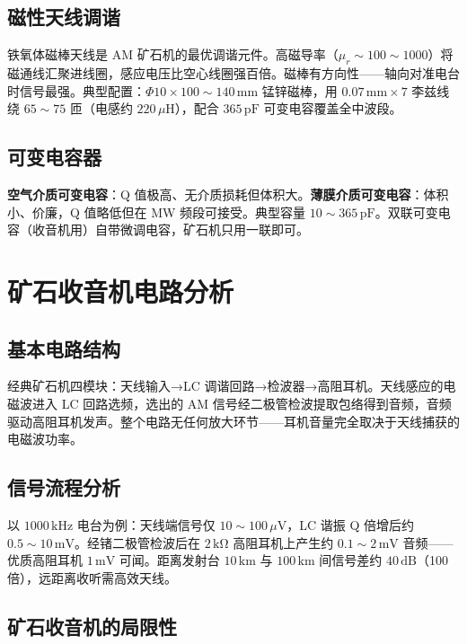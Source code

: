 \documentclass[12pt,UTF8]{ctexbook}
\begin{document}
\subsection{磁性天线调谐}

铁氧体磁棒天线是 AM 矿石机的最优调谐元件。高磁导率（$\mu_r\sim100\sim1000$）将磁通线汇聚进线圈，感应电压比空心线圈强百倍。磁棒有方向性——轴向对准电台时信号最强。典型配置：$\Phi10\times100\sim140\,\mathrm{mm}$ 锰锌磁棒，用 $0.07\,\mathrm{mm}\times7$ 李兹线绕 $65\sim75$ 匝（电感约 $220\,\mu\mathrm{H}$），配合 $365\,\mathrm{pF}$ 可变电容覆盖全中波段。

\subsection{可变电容器}

\textbf{空气介质可变电容}：Q 值极高、无介质损耗但体积大。\textbf{薄膜介质可变电容}：体积小、价廉，Q 值略低但在 MW 频段可接受。典型容量 $10\sim365\,\mathrm{pF}$。双联可变电容（收音机用）自带微调电容，矿石机只用一联即可。

\section{矿石收音机电路分析}
\label{sec:crystal_circuit_analysis}

\subsection{基本电路结构}

经典矿石机四模块：天线输入→LC 调谐回路→检波器→高阻耳机。天线感应的电磁波进入 LC 回路选频，选出的 AM 信号经二极管检波提取包络得到音频，音频驱动高阻耳机发声。整个电路无任何放大环节——耳机音量完全取决于天线捕获的电磁波功率。

\subsection{信号流程分析}

以 $1000\,\mathrm{kHz}$ 电台为例：天线端信号仅 $10\sim100\,\mu\mathrm{V}$，LC 谐振 Q 倍增后约 $0.5\sim10\,\mathrm{mV}$。经锗二极管检波后在 $2\,\mathrm{k\Omega}$ 高阻耳机上产生约 $0.1\sim2\,\mathrm{mV}$ 音频——优质高阻耳机 $1\,\mathrm{mV}$ 可闻。距离发射台 $10\,\mathrm{km}$ 与 $100\,\mathrm{km}$ 间信号差约 $40\,\mathrm{dB}$（100 倍），远距离收听需高效天线。

\subsection{矿石收音机的局限性}
\end{document}
